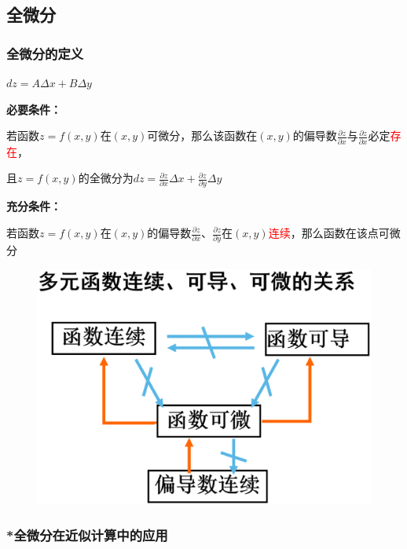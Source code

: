 \documentclass{article} %
\begin{document}
\subsection{全微分}
\subsubsection{全微分的定义}
$dz=A\Delta x+B\Delta y$\par
\hspace{3mm}

\textbf{必要条件：}\par
\hspace{10mm}若函数$z=f(x,y)$在$(x,y)$可微分，那么该函数在$(x,y)$的偏导数$\displaystyle \frac{\partial z}{\partial x}$与$\displaystyle \frac{\partial z}{\partial x}$必定\textcolor{red}{存在}，\par
\hspace{10mm}且$z=f(x,y)$的全微分为$dz=\displaystyle \frac{\partial z}{\partial x}\Delta x+\displaystyle \frac{\partial z}{\partial y}\Delta y$

\textbf{充分条件：}\par
\hspace{10mm}若函数$z=f(x,y)$在$(x,y)$的偏导数$\displaystyle \frac{\partial z}{\partial x}$、$\displaystyle \frac{\partial z}{\partial y}$在$(x,y)$\textcolor{red}{连续}，那么函数在该点可微分

\begin{figure}[htbp]
    \centering
    \includegraphics[scale=0.15]{p9-1.eps}
    \label{figure}
\end{figure}
    
\subsubsection{*全微分在近似计算中的应用}
\end{document}
